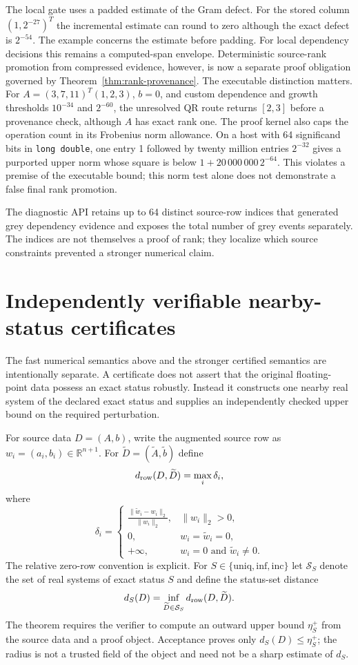 \documentclass[11pt]{article}
\theoremstyle{definition}
\newcommand{\R}{\mathbb{R}}
\begin{document}
The local gate uses a padded estimate of the Gram defect. For the stored column $(1,2^{-27})^T$ the incremental estimate can round to zero although the exact defect is $2^{-54}$. The example concerns the estimate before padding. For local dependency decisions this remains a computed-span envelope. Deterministic source-rank promotion from compressed evidence, however, is now a separate proof obligation governed by Theorem~\ref{thm:rank-provenance}. The executable distinction matters. For $A=(3,7,11)^T(1,2,3)$, $b=0$, and custom dependence and growth thresholds $10^{-34}$ and $2^{-60}$, the unresolved QR route returns $[2,3]$ before a provenance check, although $A$ has exact rank one. The proof kernel also caps the operation count in its Frobenius norm allowance. On a host with 64 significand bits in \texttt{long double}, one entry 1 followed by twenty million entries $2^{-32}$ gives a purported upper norm whose square is below $1+20\,000\,000\,2^{-64}$. This violates a premise of the executable bound; this norm test alone does not demonstrate a false final rank promotion.

The diagnostic API retains up to 64 distinct source-row indices that generated grey dependency evidence and exposes the total number of grey events separately. The indices are not themselves a proof of rank; they localize which source constraints prevented a stronger numerical claim.


\section{Independently verifiable nearby-status certificates}\label{sec:statuscert}
The fast numerical semantics above and the stronger certified semantics are intentionally separate. A certificate does not assert that the original floating-point data possess an exact status robustly. Instead it constructs one nearby real system of the declared exact status and supplies an independently checked upper bound on the required perturbation.

For source data $D=(A,b)$, write the augmented source row as $w_i=(a_i,b_i)\in\R^{n+1}$. For $\widetilde D=(\widetilde A,\widetilde b)$ define
\[
d_{\rm row}(D,\widetilde D)=\max_i\delta_i,
\]
where
\[
\delta_i=
\begin{cases}
\displaystyle \frac{\|\widetilde w_i-w_i\|_2}{\|w_i\|_2},&\|w_i\|_2>0,\\[1ex]
0,&w_i=\widetilde w_i=0,\\
+\infty,&w_i=0\text{ and }\widetilde w_i\ne0.
\end{cases}
\]
The relative zero-row convention is explicit. For $S\in\{\mathrm{uniq},\mathrm{inf},\mathrm{inc}\}$ let $\mathcal S_S$ denote the set of real systems of exact status $S$ and define the status-set distance
\[
d_S(D)=\inf_{\widetilde D\in\mathcal S_S} d_{\rm row}(D,\widetilde D).
\]
The theorem requires the verifier to compute an outward upper bound $\eta_S^+$ from the source data and a proof object. Acceptance proves only $d_S(D)\le\eta_S^+$; the radius is not a trusted field of the object and need not be a sharp estimate of $d_S$.
\end{document}
